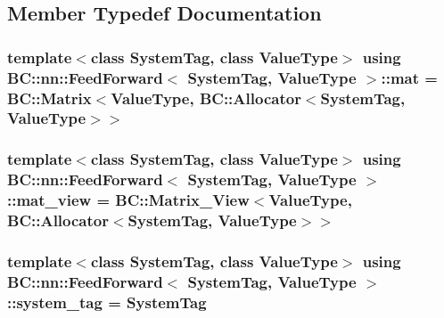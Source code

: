 \subsection{Member Typedef Documentation}
\subsubsection[{\texorpdfstring{mat}{mat}}]{\setlength{\rightskip}{0pt plus 5cm}template$<$class System\+Tag, class Value\+Type$>$ using {\bf B\+C\+::nn\+::\+Feed\+Forward}$<$ System\+Tag, Value\+Type $>$\+::{\bf mat} =  {\bf B\+C\+::\+Matrix}$<$Value\+Type, {\bf B\+C\+::\+Allocator}$<$System\+Tag, Value\+Type$>$$>$}\hypertarget{classBC_1_1nn_1_1FeedForward_aa9d6dd34a3d6e7c67bfc9d234e068d2d}{}\label{classBC_1_1nn_1_1FeedForward_aa9d6dd34a3d6e7c67bfc9d234e068d2d}
\subsubsection[{\texorpdfstring{mat\+\_\+view}{mat_view}}]{\setlength{\rightskip}{0pt plus 5cm}template$<$class System\+Tag, class Value\+Type$>$ using {\bf B\+C\+::nn\+::\+Feed\+Forward}$<$ System\+Tag, Value\+Type $>$\+::{\bf mat\+\_\+view} =  {\bf B\+C\+::\+Matrix\+\_\+\+View}$<$Value\+Type, {\bf B\+C\+::\+Allocator}$<$System\+Tag, Value\+Type$>$$>$}\hypertarget{classBC_1_1nn_1_1FeedForward_aeb218c59bd13c7f136ad98f9fef7782e}{}\label{classBC_1_1nn_1_1FeedForward_aeb218c59bd13c7f136ad98f9fef7782e}
\subsubsection[{\texorpdfstring{system\+\_\+tag}{system_tag}}]{\setlength{\rightskip}{0pt plus 5cm}template$<$class System\+Tag, class Value\+Type$>$ using {\bf B\+C\+::nn\+::\+Feed\+Forward}$<$ System\+Tag, Value\+Type $>$\+::{\bf system\+\_\+tag} =  System\+Tag}\hypertarget{classBC_1_1nn_1_1FeedForward_a91e5b58a7c6d5cb02460cc0b27ea0f51}{}\label{classBC_1_1nn_1_1FeedForward_a91e5b58a7c6d5cb02460cc0b27ea0f51}
